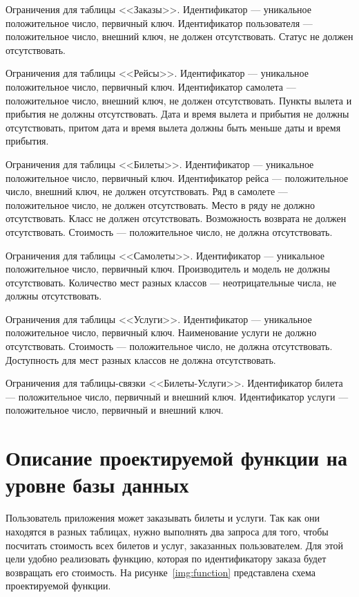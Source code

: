 \documentclass{bmstu}
\begin{document}
Ограничения для таблицы <<Заказы>>. 
Идентификатор --- уникальное положительное число, первичный ключ. 
Идентификатор пользователя --- положительное число, внешний ключ, не должен отсутствовать. 
Статус не должен отсутствовать.

Ограничения для таблицы <<Рейсы>>. 
Идентификатор --- уникальное положительное число, первичный ключ. 
Идентификатор самолета --- положительное число, внешний ключ, не должен отсутствовать. 
Пункты вылета и прибытия не должны отсутствовать. 
Дата и время вылета и прибытия не должны отсутствовать, притом дата и время вылета должны быть меньше даты и время прибытия. 

Ограничения для таблицы <<Билеты>>. 
Идентификатор --- уникальное положительное число, первичный ключ. 
Идентификатор рейса --- положительное число, внешний ключ, не должен отсутствовать. 
Ряд в самолете --- положительное число, не должен отсутствовать. 
Место в ряду не должно отсутствовать. 
Класс не должен отсутствовать. 
Возможность возврата не должен отсутствовать. 
Стоимость --- положительное число, не должна отсутствовать.

Ограничения для таблицы <<Самолеты>>. 
Идентификатор --- уникальное положительное число, первичный ключ. 
Производитель и модель не должны отсутствовать. 
Количество мест разных классов --- неотрицательные числа, не должны отсутствовать. 

Ограничения для таблицы <<Услуги>>. 
Идентификатор --- уникальное положительное число, первичный ключ. 
Наименование услуги не должно отсутствовать. 
Стоимость --- положительное число, не должна отсутствовать.
Доступность для мест разных классов не должна отсутствовать.

Ограничения для таблицы-связки <<Билеты-Услуги>>. 
Идентификатор билета --- положительное число, первичный и внешний ключ. 
Идентификатор услуги --- положительное число, первичный и внешний ключ. 

\pagebreak
\section{Описание проектируемой функции на уровне базы данных}

Пользователь приложения может заказывать билеты и услуги. 
Так как они находятся в разных таблицах, нужно выполнять два запроса для того, чтобы посчитать стоимость всех билетов и услуг, заказанных пользователем. 
Для этой цели удобно реализовать функцию, которая по идентификатору заказа будет возвращать его стоимость. 
На рисунке~\ref{img:function} представлена схема проектируемой функции.
\end{document}
